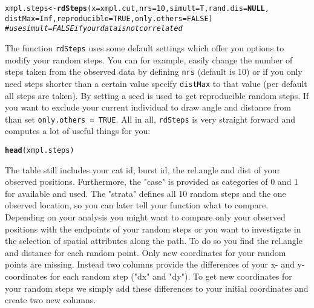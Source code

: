 \documentclass[11pt, a4paper]{article}\usepackage[]{graphicx}\usepackage[]{color}
\makeatletter
\newcommand{\hlnum}[1]{\textcolor[rgb]{0.686,0.059,0.569}{#1}}%
\newcommand{\hlcom}[1]{\textcolor[rgb]{0.678,0.584,0.686}{\textit{#1}}}%
\newcommand{\hlstd}[1]{\textcolor[rgb]{0.345,0.345,0.345}{#1}}%
\newcommand{\hlkwa}[1]{\textcolor[rgb]{0.161,0.373,0.58}{\textbf{#1}}}%
\newcommand{\hlkwb}[1]{\textcolor[rgb]{0.69,0.353,0.396}{#1}}%
\newcommand{\hlkwc}[1]{\textcolor[rgb]{0.333,0.667,0.333}{#1}}%
\newcommand{\hlkwd}[1]{\textcolor[rgb]{0.737,0.353,0.396}{\textbf{#1}}}%
\newenvironment{kframe}{%
 \def\at@end@of@kframe{}%
 \ifinner\ifhmode%
  \def\at@end@of@kframe{\end{minipage}}%
  \begin{minipage}{\columnwidth}%
 \fi\fi%
 \def\FrameCommand##1{\hskip\@totalleftmargin \hskip-\fboxsep
 \colorbox{shadecolor}{##1}\hskip-\fboxsep
     \hskip-\linewidth \hskip-\@totalleftmargin \hskip\columnwidth}%
 \MakeFramed {\advance\hsize-\width
   \@totalleftmargin\z@ \linewidth\hsize
   \@setminipage}}%
 {\par\unskip\endMakeFramed%
 \at@end@of@kframe}
\newenvironment{knitrout}{}{} %
\makeatother
\begin{document}
\begin{knitrout}
\color{fgcolor}\begin{kframe}
\begin{alltt}
\hlstd{xmpl.steps} \hlkwb{<-} \hlkwd{rdSteps}\hlstd{(}\hlkwc{x} \hlstd{= xmpl.cut,} \hlkwc{nrs} \hlstd{=} \hlnum{10}\hlstd{,} \hlkwc{simult} \hlstd{= T,} \hlkwc{rand.dis} \hlstd{=} \hlkwa{NULL}\hlstd{,}
                      \hlkwc{distMax} \hlstd{=} \hlnum{Inf}\hlstd{,} \hlkwc{reproducible} \hlstd{=} \hlnum{TRUE}\hlstd{,} \hlkwc{only.others} \hlstd{=} \hlnum{FALSE}\hlstd{)}
          \hlcom{# use simult = FALSE if your data is not correlated}
\end{alltt}
\end{kframe}
\end{knitrout}

The function \texttt{rdSteps} uses some default settings which offer you options to modify your random steps. You can for example, easily change the number of steps taken from the observed data by defining \texttt{nrs} (default is 10) or if you only need steps shorter than a certain value specify \texttt{distMax} to that value (per default all steps are taken). By setting  a seed is used to get reproducible random steps. If you want to exclude your current individual to draw angle and distance from than set \texttt{only.others = TRUE}.
All in all, \texttt{rdSteps} is very straight forward and computes a lot of useful things for you: 

\begin{knitrout}
\color{fgcolor}\begin{kframe}
\begin{alltt}
\hlkwd{head}\hlstd{(xmpl.steps)}
\end{alltt}


{\ttfamily\noindent\bfseries\color{errorcolor}{\#\# Error in head(xmpl.steps): Objekt 'xmpl.steps' nicht gefunden}}\end{kframe}
\end{knitrout}

The table still includes your cat id, burst id, the rel.angle and dist of your observed positions. Furthermore, the "case" is provided as categories of 0 and 1 for available and used. The "strata" defines all 10 random steps and the one observed location, so you can later tell your function what to compare.  
Depending on your analysis you might want to compare only your observed positions with the endpoints of your random steps or you want to investigate in the selection of spatial attributes along the path. To do so you find the rel.angle and distance for each random point. Only new coordinates for your random points are missing. Instead two columns provide the differences of your x- and y- coordinates for each random step ("dx" and "dy"). To get new coordinates for your random steps we simply add these differences to your initial coordinates and create two new columns. 
\end{document}
